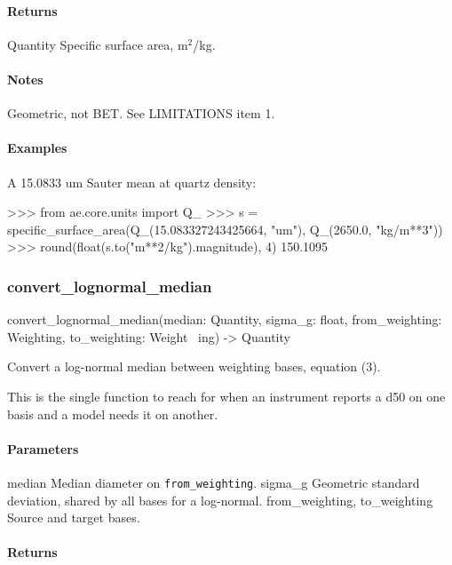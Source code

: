 \documentclass[10pt,a4paper,twoside]{report}
\begin{document}
\paragraph*{Returns}

Quantity Specific surface area, m$^{2}$/kg.

\paragraph*{Notes}

Geometric, not BET. See LIMITATIONS item 1.

\paragraph*{Examples}

A 15.0833 um Sauter mean at quartz density:

\begin{doctestblock}
>>> from ae.core.units import Q_
>>> s = specific_surface_area(Q_(15.083327243425664, "um"), Q_(2650.0, "kg/m**3"))
>>> round(float(s.to("m**2/kg").magnitude), 4)
150.1095
\end{doctestblock}

\subsubsection*{convert\_lognormal\_median}

\begin{verbatimsmall}
convert_lognormal_median(median: Quantity, sigma_g: float, from_weighting: Weighting, to_weighting: Weight
    \ ing) -> Quantity
\end{verbatimsmall}

Convert a log-normal median between weighting bases, equation (3).

This is the single function to reach for when an instrument reports a d50 on one basis and a model needs it on another.

\paragraph*{Parameters}

median Median diameter on \texttt{from\_weighting}. sigma\_g Geometric standard deviation, shared by all bases for a log-normal. from\_weighting, to\_weighting Source and target bases.

\paragraph*{Returns}
\end{document}
